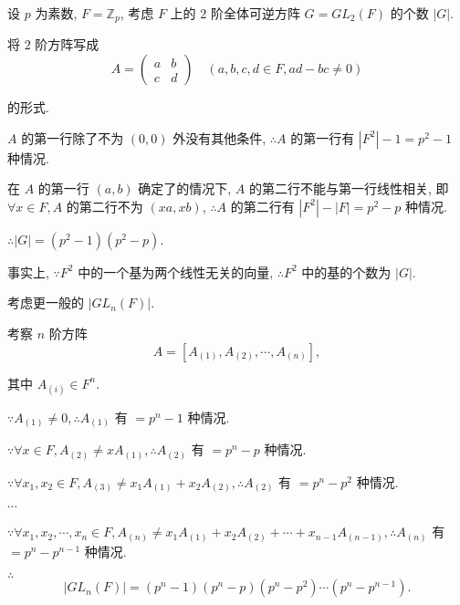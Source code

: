 \documentclass[color=black,device=normal,lang=cn,mode=geye]{elegantnote}
\begin{document}
\begin{example}
    设 $p$ 为素数, $F=\mathbb{Z}_p$, 考虑 $F$ 上的 $2$ 阶全体可逆方阵 $G= GL _2(F)$ 的个数 $|G|$.

    将 $2$ 阶方阵写成
    \[A=\begin{pmatrix}
        a & b \\
        c & d
    \end{pmatrix}\quad(a,b,c,d\in F,ad-bc\neq0)\]

    的形式.

    $A$ 的第一行除了不为 $(0,0)$ 外没有其他条件, $\therefore A$ 的第一行有 $|F^2|-1=p^2-1$ 种情况.

    在 $A$ 的第一行 $(a,b)$ 确定了的情况下, $A$ 的第二行不能与第一行线性相关, 即 $\forall x\in F,A$ 的第二行不为 $(xa,xb)$, $\therefore A$ 的第二行有 $|F^2|-|F|=p^2-p$ 种情况.

    $\therefore|G|=(p^2-1)(p^2-p)$.

    事实上, $\because F^2$ 中的一个基为两个线性无关的向量, $\therefore F^2$ 中的基的个数为 $|G|$.

    考虑更一般的 $| GL _n(F)|$.

    考察 $n$ 阶方阵
    \[A=[A_{(1)},A_{(2)},\cdots,A_{(n)}],\]

    其中 $A_{(i)}\in F^n$.

    $\because A_{(1)}\neq0,\therefore A_{(1)}$ 有 $=p^n-1$ 种情况.

    $\because\forall x\in F,A_{(2)}\neq xA_{(1)},\therefore A_{(2)}$ 有 $=p^n-p$ 种情况.

    $\because\forall x_1,x_2\in F,A_{(3)}\neq x_1A_{(1)}+x_2A_{(2)},\therefore A_{(2)}$ 有 $=p^n-p^2$ 种情况.

    $\cdots$

    $\because\forall x_1,x_2,\cdots,x_n\in F,A_{(n)}\neq x_1A_{(1)}+x_2A_{(2)}+\cdots+x_{n-1}A_{(n-1)},\therefore A_{(n)}$ 有 $=p^n-p^{n-1}$ 种情况.

    $\therefore$
    \[| GL_n(F)|=(p^n-1)(p^n-p)(p^n-p^2)\cdots(p^n-p^{n-1}).\]
\end{example}
\end{document}
